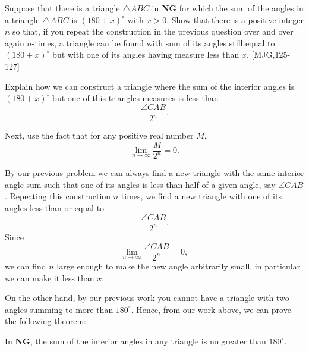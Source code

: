 \documentclass{ximera}
\begin{document}
\begin{question}
\label{121} Suppose that there is a triangle $\triangle ABC$ in
\textbf{NG} for which the sum of the angles in a triangle $\triangle
ABC$ is $\left( 180+x\right)^\circ$ with $x>0$. Show that there is a
positive integer $n$ so that, if you repeat the construction in the
previous question over and over again $n$-times, a triangle can be
found with sum of its angles still equal to $\left(180+x\right)^\circ$
but with one of its angles having measure less than $x$. [MJG,125-127]

\begin{solution}
\begin{hint}
Explain how we can construct a triangle where the sum of the interior
angles is $(180+x)^\circ$ but one of this triangles measures is less than
\[
\frac{\angle CAB}{2^n}.
\]
\end{hint}
\begin{hint}
Next, use the fact that for any positive real number $M$,
\[
\lim_{n\to \infty}\frac{M}{2^n} = 0.
\]
\end{hint}
\begin{freeResponse}
By our previous problem we can always find a new triangle with the
same interior angle sum such that one of its angles is less than half
of a given angle, say $\angle CAB$. Repeating this construction $n$
times, we find a new triangle with one of its angles less than or
equal to
\[
\frac{\angle CAB}{2^n}.
\]
Since 
\[
\lim_{n\to \infty}\frac{\angle CAB}{2^n} = 0,
\]
we can find $n$ large enough to make the new angle arbitrarily small, in
particular we can make it less than $x$.
\end{freeResponse}
\end{solution}
\end{question}


On the other hand, by our previous work%
you cannot have a triangle with two angles summing to more than
$180^\circ$. Hence, from our work above, we can prove the following
theorem:

\begin{theorem}
In \textbf{NG}, the sum of the interior angles in any triangle is no greater
than $180^\circ$.
\end{theorem}
\end{document}
